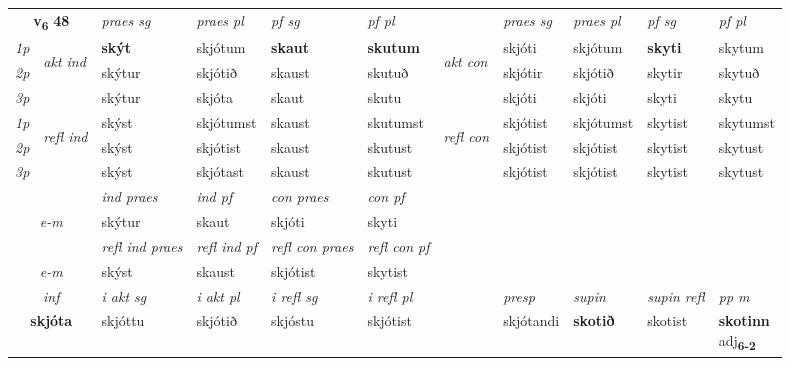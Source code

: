 \noindent
\begin{tabular}{lllllllllll} \toprule
\multicolumn{2}{c}{\textbf{v{\textsubscript{6}}} \Large{\textbf{48}}}  &  \textit{praes sg}  & \textit{praes pl}  &\textit{ pf sg} & \textit{pf pl} &  &  \textit{praes sg}  & \textit{praes pl}  & \textit{pf sg} & \textit{pf pl } \\*
	\cmidrule{3-6} \cmidrule{8-11}
 {\textit{1p}} & \multirow{3}{*}{\begin{turn}{90}\textit{akt ind}\end{turn}} & \textbf{skýt} & skjótum & \textbf{skaut} & \textbf{skutum} & \multirow{3}{*}{\begin{turn}{90}\textit{akt con}\end{turn}} &skjóti & skjótum & \textbf{skyti} & skytum\\*
 {\textit{2p}} &  &  skýtur  & skjótið & skaust & skutuð & & skjótir & skjótið & skytir & skytuð \\*
{\textit{3p}} &  & skýtur & skjóta & skaut & skutu & & skjóti & skjóti& skyti & skytu \\*
\cmidrule{3-6} \cmidrule{8-11}
 {\textit{1p}} & \multirow{3}{*}{\begin{turn}{90}\textit{refl ind}\end{turn}}  & skýst & skjótumst & skaust & skutumst & \multirow{3}{*}{\begin{turn}{90}\textit{refl con}\end{turn}}  &skjótist & skjótumst & skytist & skytumst \\*
 {\textit{2p}} &  & skýst & skjótist & skaust & skutust & &skjótist & skjótist & skytist & skytust \\*
 {\textit{3p}}  & & skýst & skjótast & skaust & skutust & & skjótist & skjótist& skytist & skytust \\*
\cmidrule{3-6} \cmidrule{8-11}

   & &  \textit{ind praes} & \textit{ind pf} & \textit{con praes} & \textit{con pf} \\*
\multicolumn{2}{c}{ \textit{e-m} } & skýtur & skaut & skjóti & skyti \\*

\cmidrule{3-6}
 & & \textit{refl ind praes} & \textit{refl ind pf} & \textit{refl con praes} & \textit{refl con pf} \\*
 \multicolumn{2}{c}{ \textit{e-m} }& skýst & skaust & skjótist & skytist \\*

\cmidrule{3-11}
   \multicolumn{2}{c}{\textit{inf}}  & \textit{i akt sg} & \textit{i akt pl} & \textit{i refl sg} & \textit{i refl pl} && \textit{presp} & \textit{supin} & \textit{supin refl} & \textit{pp m} \\*
  \multicolumn{2}{c}{\textbf{skjóta}} & skjóttu  & skjótið & skjóstu & skjótist && skjótandi &  \textbf{skotið} & skotist & \specialcell{\textbf{skotinn} \\ adj\textbf{\textsubscript{6-2}}} \\*
\end{tabular}

